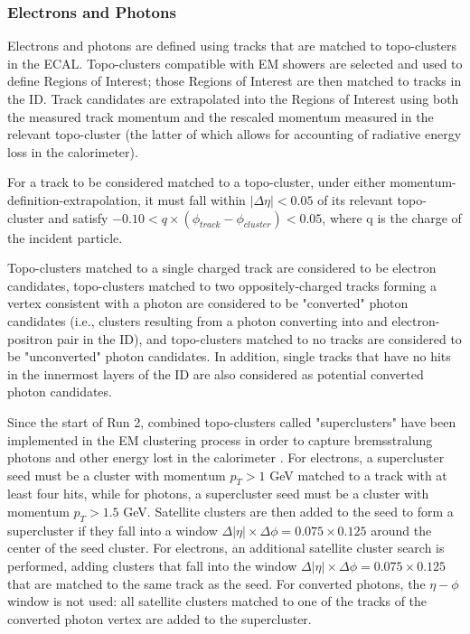 \subsubsection{Electrons and Photons} \label{sec:Electrons} 

Electrons and photons are defined using tracks that are matched to topo-clusters in the ECAL. Topo-clusters compatible with EM showers are selected and used to define Regions of Interest; those Regions of Interest are then matched to tracks in the ID. Track candidates are extrapolated into the Regions of Interest using both the measured track momentum and the rescaled momentum measured in the relevant topo-cluster (the latter of which allows for accounting of radiative energy loss in the calorimeter). 

For a track to be considered matched to a topo-cluster, under either momentum-definition-extrapolation, it must fall within $|\Delta \eta| < 0.05$ of its relevant topo-cluster and satisfy $-0.10 < q \times (\phi_{track}-\phi_{cluster}) < 0.05$, where q is the charge of the incident particle. 

Topo-clusters matched to a single charged track are considered to be electron candidates, topo-clusters matched to two oppositely-charged tracks forming a vertex consistent with a photon are considered to be "converted" photon candidates (i.e., clusters resulting from a photon converting into and electron-positron pair in the ID), and topo-clusters matched to no tracks are considered to be "unconverted" photon candidates. In addition, single tracks that have no hits in the innermost layers of the ID are also considered as potential converted photon candidates\cite{CERN-EP-2019-145}. 

Since the start of Run 2, combined topo-clusters called "superclusters" have been implemented in the EM clustering process in order to capture bremsstralung photons and other energy lost in the calorimeter \cite{ATL-PHYS-PUB-2017-022}. For electrons, a supercluster seed must be a cluster with momentum $p_{T} > 1$ GeV matched to a track with at least four hits, while for photons, a supercluster seed must be a cluster with momentum $p_{T} > 1.5$ GeV. Satellite clusters are then added to the seed to form a supercluster if they fall into a window $\Delta |\eta| \times \Delta\phi = 0.075 \times 0.125$ around the center of the seed cluster. For electrons, an additional satellite cluster search is performed, adding clusters that fall into the window $\Delta |\eta| \times \Delta\phi = 0.075 \times 0.125$ that are matched to the same track as the seed. For converted photons, the $\eta-\phi$ window is not used: all satellite clusters matched to one of the tracks of the converted photon vertex are added to the supercluster.

